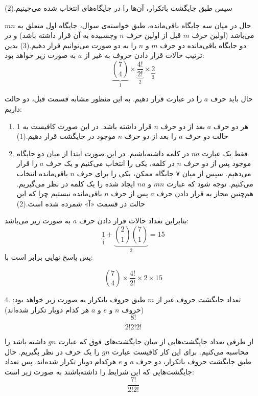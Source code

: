     \p
    سپس طبق جایگشت باتکرار، آن‌ها را در جایگاه‌های انتخاب شده می‌چینیم.(2)
    
    \p
    حال در میان سه جایگاه باقی‌مانده، طبق خواسته‌ی سوال، جایگاه اول متعلق به $mn$ می‌باشد
    (اولین حرف $m$ قبل از اولین حرف $n$ وچسبیده به آن قرار داشته باشد)
    و در دو جایگاه باقی‌مانده دو حرف $m$ و $n$ را به دو صورت می‌توانیم قرار دهیم.(3)
    \p
    بدین ترتیب حالات قرار دادن حروف به غیر از $a$ به صورت زیر خواهد بود:
    $$\underbrace{{7\choose 4}}_{1} \times \underbrace{\frac{4!}{2!}}_{2} \times \underbrace{2}_{3}$$
    
    حال باید حرف $a$ را در عبارت قرار دهیم.
    به این منظور مشابه قسمت قبل، دو حالت داریم:
    \begin{enumerate}
      \item 
      
      هر دو حرف $a$ بعد از دو حرف $n$ قرار داشته باشد. در این صورت کافیست به 1 حالت دو حرف $a$ را بعد از دو حرف $n$ موجود در جایگشت قرار دهیم.(1)
      \item
      
      فقط یک عبارت $na$ در کلمه داشته‌باشیم. در این صورت ابتدا از میان دو جایگاه موجود پس از دو حرف $n$ در کلمه، یکی را انتخاب می‌کنیم و یک حرف $a$ را قرار می‌دهیم. سپس از میان ۷ جایگاه ممکن، یکی را برای حرف $n$ باقی‌مانده انتخاب می‌کنیم.
      توجه شود که عبارت $mn$ و $na$ ایجاد شده را یک کلمه‌ در نظر می‌گیریم. هم‌چنین مجاز به قرار دادن حرف $a$ پس از حرف $n$ باقی‌مانده نیستیم چرا که این حالت در قسمت «آ» شمرده شده است.(2)
    \end{enumerate}
    \p
    بنابراین تعداد حالات قرار دادن حرف $a$ به صورت زیر می‌باشد:
    $$\underbrace{1}_{1} + \underbrace{{2\choose 1}{7\choose 1}}_{2} = 15$$ 
    پس پاسخ نهایی برابر است با:
    
    $${7\choose 4} \times \frac{4!}{2!} \times 2 \times 15$$

    4.
    \p
    تعداد جایگشت حروف غیر از $m$
    طبق حروف باتکرار به صورت زیر خواهد بود:
    (حروف $n$ و $e$ و $a$ هر کدام دوبار تکرار شده‌اند)
    $$\frac{8!}{2!2!2!}$$
    
    از طرفی تعداد جایگشت‌هایی از میان جایگشت‌های فوق که عبارت $gn$ داشته باشد را محاسبه می‌کنیم. برای این کار کافیست عبارت $gn$ را یک حرف در نظر بگیریم. حال طبق جایگشت حروف باتکرار، دو حرف $a$ و $e$ هرکدام دوبار تکرار شده‌اند. پس تعداد جایگشت‌هایی که این شرایط را داشته‌باشند به صورت زیر است:
    $$\frac{7!}{2!2!}$$
    
